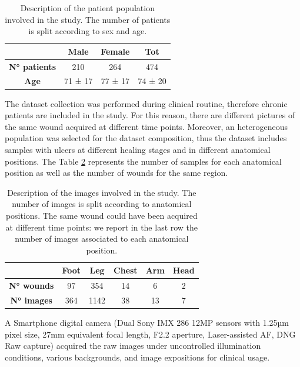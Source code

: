 \documentclass[../main.tex]{subfiles}
\begin{document}
\begin{table}[!ht]
    \centering
    \begin{tabular}{c|c|c|c|}
    
         & \textbf{Male} & \textbf{Female} & \textbf{Tot} \\ \hline
        \textbf{N° patients} & 210 & 264 & 474 \\ 
        \textbf{Age} & 71 ± 17 & 77 ± 17 & 74 ± 20 \\ \hline
    \end{tabular}
    \caption{Description of the patient population involved in the study. The number of patients is split according to sex and age.}
    \label{tab:patients-deepskin}
\end{table}
The dataset collection was performed during clinical routine, therefore chronic patients are included in the study.
For this reason, there are different pictures of the same wound acquired at different time points. 
Moreover, an heterogeneous population was selected for the dataset composition, thus the dataset includes samples with ulcers at different healing stages and in different anatomical positions.
The Table \ref{tab:wounds-deepsk} represents the number of samples for each anatomical position as well as the number of wounds for the same region.

\begin{table}[!ht]
    \centering
    \begin{tabular}{c|c|c|c|c|c|}
  
        \textbf{} & \textbf{Foot} & \textbf{Leg} & \textbf{Chest} & \textbf{Arm} & \textbf{Head} \\ \hline
        \textbf{N° wounds} & 97 & 354 & 14 & 6 & 2 \\ 
        \textbf{N° images} & 364 & 1142 & 38 & 13 & 7 \\ \hline
    \end{tabular}
    \caption{Description of the images involved in the study. The number of images is split according to anatomical positions. The same wound could have been acquired at different time points: we report in the last row the number of images associated to each anatomical position.}
    \label{tab:wounds-deepsk}
\end{table}
A Smartphone digital camera (Dual Sony IMX 286 12MP sensors with 1.25µm pixel size, 27mm equivalent focal length, F2.2 aperture, Laser-assisted AF, DNG Raw capture) acquired the raw images under uncontrolled illumination conditions, various backgrounds, and image expositions for clinical usage.
\end{document}

